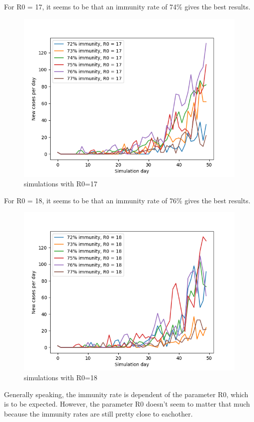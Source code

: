 \documentclass[runningheads]{llncs}
\begin{document}
\newpage
\noindent
For R0 = 17, it seems to be that an immunity rate of 74\%  gives the best results.
\begin{figure}
	\includegraphics[width=\textwidth]{test_R0_17.png}
	\caption{simulations with R0=17}
\end{figure}

\newpage
\noindent
For R0 = 18, it seems to be that an immunity rate of 76\%  gives the best results.
\begin{figure}
	\includegraphics[width=\textwidth]{test_R0_18.png}
	\caption{simulations with R0=18}
\end{figure}

\newpage
\noindent
Generally speaking, the immunity rate is dependent of the parameter R0, which is to be expected. However, the parameter R0 doesn't seem to matter that much because the immunity rates are still pretty close to eachother.
\end{document}
